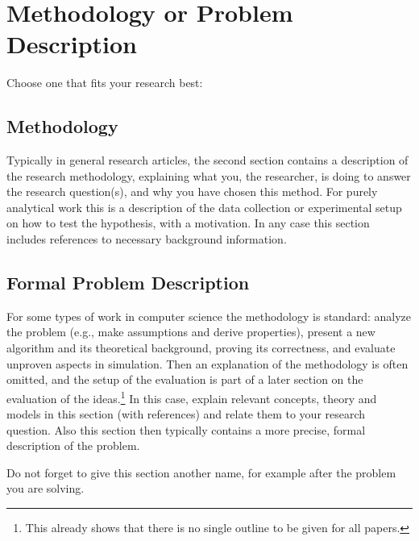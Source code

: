\section{Methodology or Problem Description}
Choose one that fits your research best:
\subsection{Methodology}
Typically in general research articles, the second section contains a description of the research methodology, explaining what you, the researcher, is doing to answer the research question(s), and why you have chosen this method.
For purely analytical work this is a description of the data collection or experimental setup on how to test the hypothesis, with a motivation.
In any case this section includes references to necessary background information.

\subsection{Formal Problem Description}
For some types of work in computer science the methodology is standard: analyze the problem (e.g., make assumptions and derive properties), present a new algorithm and its theoretical background, proving its correctness, and evaluate unproven aspects in simulation.
Then an explanation of the methodology is often omitted, and the setup of the evaluation is part of a later section on the evaluation of the ideas.\footnote{This already shows that there is no single outline to be given for all papers.}
In this case, explain relevant concepts, theory and models in this section (with references) and relate them to your research question.
Also this section then typically contains a more precise, formal description of the problem.

Do not forget to give this section another name, for example after the problem you are solving.